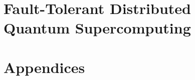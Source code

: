 \documentclass[11pt,twoside,openany,a4paper]{book}
\begin{document}
\part{Fault-Tolerant Distributed Quantum Supercomputing}




\appendix
\part*{Appendices}






\backmatter

\nocite{*}


\end{document}
